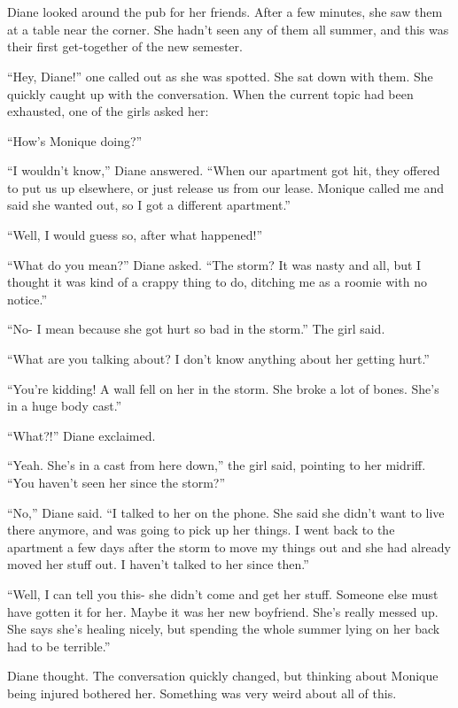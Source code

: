 \chapter{~}
Diane looked around the pub for her friends. After a few minutes, she saw them at a table
near the corner. She hadn't seen any of them all summer, and this was their first get-together
of the new semester.

``Hey, Diane!'' one called out as she was spotted. She sat down with them. She quickly
caught up with the conversation. When the current topic had been exhausted, one of the girls
asked her:

``How's Monique doing?''

``I wouldn't know,'' Diane answered. ``When our apartment got hit, they offered to put us
up elsewhere, or just release us from our lease. Monique called me and said she wanted out, so I
got a different apartment.''

``Well, I would guess so, after what happened!''

``What do you mean?'' Diane asked. ``The storm? It was nasty and all, but I thought it was
kind of a crappy thing to do, ditching me as a roomie with no notice.''

``No- I mean because she got hurt so bad in the storm.'' The girl said.

``What are you talking about? I don't know anything about her getting hurt.''

``You're kidding! A wall fell on her in the storm. She broke a lot of bones. She's in a
huge body cast.''

``What?!'' Diane exclaimed.

``Yeah. She's in a cast from here down,'' the girl said, pointing to her midriff. ``You
haven't seen her since the storm?''

``No,'' Diane said. ``I talked to her on the phone. She said she didn't want to live there
anymore, and was going to pick up her things. I went back to the apartment a few days after the
storm to move my things out and she had already moved her stuff out. I haven't talked to her
since then.''

``Well, I can tell you this- she didn't come and get her stuff. Someone else must have
gotten it for her. Maybe it was her new boyfriend. She's really messed up. She says she's
healing nicely, but spending the whole summer lying on her back had to be terrible.''

 Diane thought. The
conversation quickly changed, but thinking about Monique being injured bothered her.  Something was very weird about all of this.


